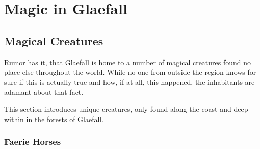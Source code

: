 \chapter{Magic in Glaefall}

\section{Magical Creatures}

Rumor has it, that Glaefall is home to a number of magical creatures found no place else throughout the world.
While no one from outside the region knows for sure if this is actually true and how, if at all, this happened, the inhabitants are adamant about that fact.

This section introduces unique creatures, only found along the coast and deep within in the forests of Glaefall.


\clearpage

\subsection{Faerie Horses}